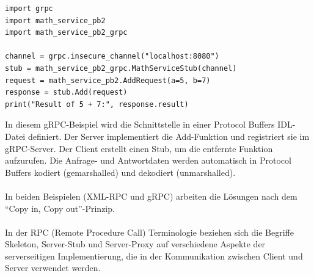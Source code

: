 \documentclass[../vs-script-first-v01.tex]{subfiles}
\begin{document}
\noindent\begin{minipage}{\textwidth}
\begin{lstlisting}[caption={gRPC Client Python},captionpos=b,label={lst:grpc-client}]
import grpc
import math_service_pb2
import math_service_pb2_grpc

channel = grpc.insecure_channel("localhost:8080")
stub = math_service_pb2_grpc.MathServiceStub(channel)
request = math_service_pb2.AddRequest(a=5, b=7)
response = stub.Add(request)
print("Result of 5 + 7:", response.result)
\end{lstlisting}
\end{minipage}
In diesem gRPC-Beispiel wird die Schnittstelle in einer Protocol Buffers IDL-Datei definiert. Der Server implementiert die Add-Funktion und registriert sie im gRPC-Server. Der Client erstellt einen Stub, um die entfernte Funktion aufzurufen. Die Anfrage- und Antwortdaten werden automatisch in Protocol Buffers kodiert (gemarshalled) und dekodiert (unmarshalled).
\\\\
In beiden Beispielen (XML-RPC und gRPC) arbeiten die Lösungen nach dem \enquote{Copy in, Copy out}-Prinzip.
\\\\
In der RPC (Remote Procedure Call) Terminologie beziehen sich die Begriffe Skeleton, Server-Stub und Server-Proxy auf verschiedene Aspekte der serverseitigen Implementierung, die in der Kommunikation zwischen Client und Server verwendet werden. 
\end{document}
